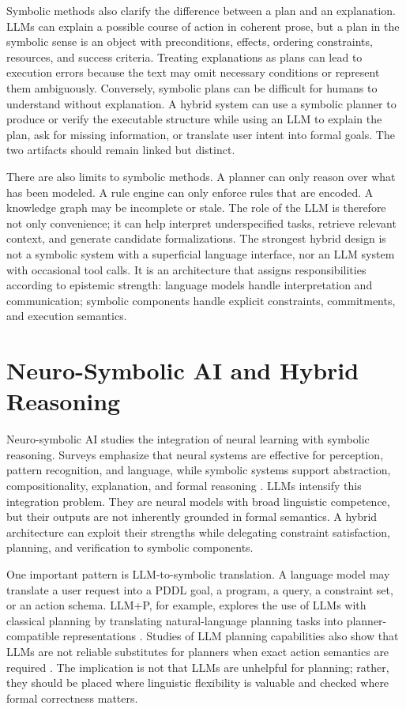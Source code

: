 Symbolic methods also clarify the difference between a plan and an explanation. LLMs can explain a possible course of action in coherent prose, but a plan in the symbolic sense is an object with preconditions, effects, ordering constraints, resources, and success criteria. Treating explanations as plans can lead to execution errors because the text may omit necessary conditions or represent them ambiguously. Conversely, symbolic plans can be difficult for humans to understand without explanation. A hybrid system can use a symbolic planner to produce or verify the executable structure while using an LLM to explain the plan, ask for missing information, or translate user intent into formal goals. The two artifacts should remain linked but distinct.

There are also limits to symbolic methods. A planner can only reason over what has been modeled. A rule engine can only enforce rules that are encoded. A knowledge graph may be incomplete or stale. The role of the LLM is therefore not only convenience; it can help interpret underspecified tasks, retrieve relevant context, and generate candidate formalizations. The strongest hybrid design is not a symbolic system with a superficial language interface, nor an LLM system with occasional tool calls. It is an architecture that assigns responsibilities according to epistemic strength: language models handle interpretation and communication; symbolic components handle explicit constraints, commitments, and execution semantics.

\section{Neuro-Symbolic AI and Hybrid Reasoning}

Neuro-symbolic AI studies the integration of neural learning with symbolic reasoning. Surveys emphasize that neural systems are effective for perception, pattern recognition, and language, while symbolic systems support abstraction, compositionality, explanation, and formal reasoning \cite{besold2017neural,garcez2019neural,hitzler2022neuro}. LLMs intensify this integration problem. They are neural models with broad linguistic competence, but their outputs are not inherently grounded in formal semantics. A hybrid architecture can exploit their strengths while delegating constraint satisfaction, planning, and verification to symbolic components.

One important pattern is LLM-to-symbolic translation. A language model may translate a user request into a PDDL goal, a program, a query, a constraint set, or an action schema. LLM+P, for example, explores the use of LLMs with classical planning by translating natural-language planning tasks into planner-compatible representations \cite{liu2023llmp}. Studies of LLM planning capabilities also show that LLMs are not reliable substitutes for planners when exact action semantics are required \cite{valmeekam2023planbench}. The implication is not that LLMs are unhelpful for planning; rather, they should be placed where linguistic flexibility is valuable and checked where formal correctness matters.

